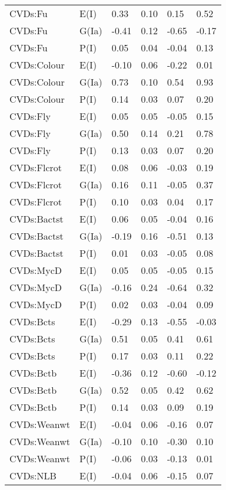 \begin{center}
\begin{longtable}{|p{1.1in}|p{0.7in}|p{0.7in}|p{0.6in}|p{0.6in}|p{0.6in}|}
  CVDs:Fu & E(I) & 0.33 & 0.10 & 0.15 & 0.52 \\ 
  CVDs:Fu & G(Ia) & -0.41 & 0.12 & -0.65 & -0.17 \\ 
  CVDs:Fu & P(I) & 0.05 & 0.04 & -0.04 & 0.13 \\ 
  CVDs:Colour & E(I) & -0.10 & 0.06 & -0.22 & 0.01 \\ 
  CVDs:Colour & G(Ia) & 0.73 & 0.10 & 0.54 & 0.93 \\ 
  CVDs:Colour & P(I) & 0.14 & 0.03 & 0.07 & 0.20 \\ 
  CVDs:Fly & E(I) & 0.05 & 0.05 & -0.05 & 0.15 \\ 
  CVDs:Fly & G(Ia) & 0.50 & 0.14 & 0.21 & 0.78 \\ 
  CVDs:Fly & P(I) & 0.13 & 0.03 & 0.07 & 0.20 \\ 
  CVDs:Flcrot & E(I) & 0.08 & 0.06 & -0.03 & 0.19 \\ 
  CVDs:Flcrot & G(Ia) & 0.16 & 0.11 & -0.05 & 0.37 \\ 
  CVDs:Flcrot & P(I) & 0.10 & 0.03 & 0.04 & 0.17 \\ 
  CVDs:Bactst & E(I) & 0.06 & 0.05 & -0.04 & 0.16 \\ 
  CVDs:Bactst & G(Ia) & -0.19 & 0.16 & -0.51 & 0.13 \\ 
  CVDs:Bactst & P(I) & 0.01 & 0.03 & -0.05 & 0.08 \\ 
  CVDs:MycD & E(I) & 0.05 & 0.05 & -0.05 & 0.15 \\ 
  CVDs:MycD & G(Ia) & -0.16 & 0.24 & -0.64 & 0.32 \\ 
  CVDs:MycD & P(I) & 0.02 & 0.03 & -0.04 & 0.09 \\ 
  CVDs:Bcts & E(I) & -0.29 & 0.13 & -0.55 & -0.03 \\ 
  CVDs:Bcts & G(Ia) & 0.51 & 0.05 & 0.41 & 0.61 \\ 
  CVDs:Bcts & P(I) & 0.17 & 0.03 & 0.11 & 0.22 \\ 
  CVDs:Bctb & E(I) & -0.36 & 0.12 & -0.60 & -0.12 \\ 
  CVDs:Bctb & G(Ia) & 0.52 & 0.05 & 0.42 & 0.62 \\ 
  CVDs:Bctb & P(I) & 0.14 & 0.03 & 0.09 & 0.19 \\ 
  CVDs:Weanwt & E(I) & -0.04 & 0.06 & -0.16 & 0.07 \\ 
  CVDs:Weanwt & G(Ia) & -0.10 & 0.10 & -0.30 & 0.10 \\ 
  CVDs:Weanwt & P(I) & -0.06 & 0.03 & -0.13 & 0.01 \\ 
  CVDs:NLB & E(I) & -0.04 & 0.06 & -0.15 & 0.07 \\ 

\end{longtable}
\end{center}

